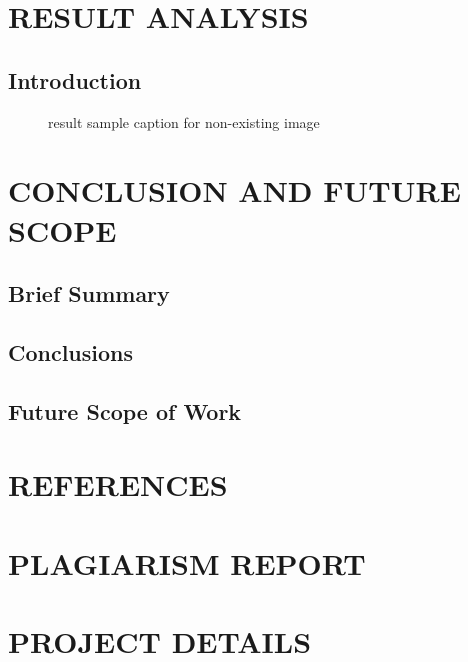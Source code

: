 \documentclass[a4paper,12pt]{report}
\begin{document}
\chapter{\textbf{\Large RESULT ANALYSIS}}
\section{\textbf{ Introduction }}
\begin{figure}
\caption{result sample caption for non-existing image}
\end{figure}
\newpage
\chapter{\textbf{\Large CONCLUSION AND FUTURE SCOPE}}
\section{\textbf{ Brief Summary }}
\section{\textbf{ Conclusions }}
\section{\textbf{Future Scope of Work}}
\newpage
{}
\chapter*{\textbf{\Large REFERENCES}}
\newpage
{}
\chapter*{\textbf{\Large PLAGIARISM REPORT}}
\newpage
{}
\chapter*{\textbf{\Large PROJECT DETAILS}}
\end{document}
